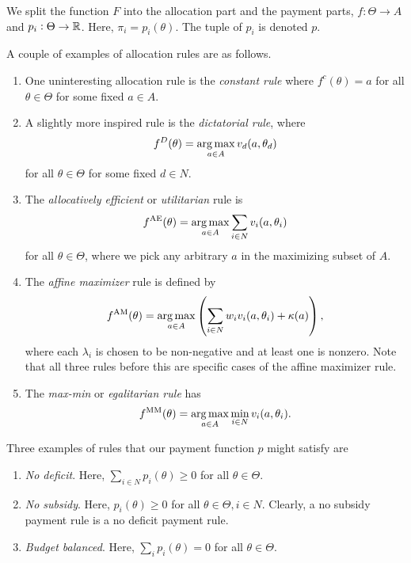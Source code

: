 		We split the function $F$ into the allocation part and the payment parts, $f : \Theta \to A$ and $p_i : \Theta \to \mathbb{R}$. Here, $\pi_i = p_i(\theta)$. The tuple of $p_i$ is denoted $p$.

		\begin{fex}
			\label{ex: payment alloc rules}
			A couple of examples of allocation rules are as follows.
			\begin{enumerate}
				\item One uninteresting allocation rule is the \emph{constant rule} where $f^c(\theta) = a$ for all $\theta \in \Theta$ for some fixed $a \in A$.

				\item A slightly more inspired rule is the \emph{dictatorial rule}, where
				\[ f^D(\theta) = \operatorname*{arg\,max}_{a \in A} v_d(a,\theta_d) \]
				for all $\theta \in \Theta$ for some fixed $d \in N$.
				
				\item The \emph{allocatively efficient} or \emph{utilitarian} rule is
				\[ f^{\text{AE}}(\theta) = \operatorname*{arg\,max}_{a \in A} \sum_{i \in N} v_i(a,\theta_i) \]
				for all $\theta \in \Theta$, where we pick any arbitrary $a$ in the maximizing subset of $A$.

				\item The \emph{affine maximizer} rule is defined by
				\[ f^{\text{AM}}(\theta) = \operatorname*{arg\,max}_{a \in A} \left( \sum_{i \in N} w_i v_i(a,\theta_i) + \kappa(a) \right), \]
				where each $\lambda_i$ is chosen to be non-negative and at least one is nonzero. Note that all three rules before this are specific cases of the affine maximizer rule.

				\item The \emph{max-min} or \emph{egalitarian rule} has
				\[ f^\text{MM}(\theta) = \operatorname*{arg\,max}_{a \in A} \min_{i \in N} v_i(a,\theta_i). \]
			\end{enumerate}
		\end{fex}

		\begin{fex}
			\label{ex: payment rules}
			Three examples of rules that our payment function $p$ might satisfy are
			\begin{enumerate}
				\item \emph{No deficit}. Here, $\sum_{i \in N} p_i(\theta) \ge 0$ for all $\theta \in \Theta$.
				\item \emph{No subsidy}. Here, $p_i(\theta) \ge 0$ for all $\theta \in \Theta, i \in N$. Clearly, a no subsidy payment rule is a no deficit payment rule.
				\item \emph{Budget balanced}. Here, $\sum_i p_i(\theta) = 0$ for all $\theta \in \Theta$. 
			\end{enumerate}
		\end{fex}

